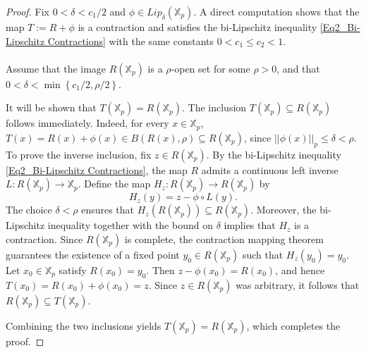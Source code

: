 \documentclass[a4paper, 12pt]{article}
\theoremstyle{definition}
\begin{document}
	
	\begin{proof}
		
		Fix $0  < \delta  <  c_{1}/2$ and $\phi \in Lip_{\delta} \left(  \mathbb{X}_{p}  \right) $. A direct computation shows that the map $T:= R + \phi$ is a contraction and satisfies the bi-Lipschitz inequality \eqref{Eq2_Bi-Lipschitz Contractions} with the same constants $0  < c_{1} \le c_{2}  < 1$. 
		
		
		
		\paragraph{}
		Assume that the image $R \left(  \mathbb{X}_{p}  \right) $ is a $\rho$-open set for some $\rho  > 0$, and that $ 0 < \delta  < \min \left\{  c_{1}/2, \rho / 2  \right\} $. 
		
		It will be shown that $T \left(  \mathbb{X}_{p}  \right)  = R \left(  \mathbb{X}_{p}  \right) $. The inclusion $T \left(  \mathbb{X}_{p}  \right)  \subseteq R \left(  \mathbb{X}_{p}  \right) $ follows immediately. Indeed, for every $x \in \mathbb{X}_{p}$, $T \left(  x  \right)  = R \left(  x  \right)  + \phi \left(  x  \right)  \in B \left(  R \left(  x  \right) , \rho  \right)  \subseteq R \left(  \mathbb{X}_{p}  \right) $, since $ \left| \left|  \phi \left(  x \right)   \right|  \right|_{p} \le \delta < \rho$.   
		To prove the inverse inclusion, fix $z \in R \left(  \mathbb{X}_{p}  \right) $. By the bi-Lipschitz inequality \eqref{Eq2_Bi-Lipschitz Contractions}, the map $R$ admits a continuous left inverse $L: R \left(  \mathbb{X}_{p}  \right)  \to \mathbb{X}_{p}$.  
		Define the map $H_{z}: R \left(  \mathbb{X}_{p}  \right)  \to R \left(  \mathbb{X}_{p}  \right) $ by  
		$$ H_{z} \left(  y  \right)    =   z - \phi \circ L (y) .$$ 
		The choice $\delta < \rho$ ensures that $H_{z} \left(  R \left(  \mathbb{X}_{p}  \right)   \right)  \subseteq R \left(  \mathbb{X}_{p}  \right) $. 
		Moreover, the bi-Lipschitz inequality together with the bound on $\delta$ implies that $H_{z}$ is a contraction. Since $R \left(  \mathbb{X}_{p}  \right) $ is complete, the contraction mapping theorem guarantees the existence of a fixed point $y_{0} \in R \left(  \mathbb{X}_{p}  \right) $ such that $H_{z} \left(  y_{0}  \right)  = y_{0}$. Let $x_{0}  \in \mathbb{X}_{p}$ satisfy $R \left(  x_{0}  \right)  = y_{0}$. Then $ z - \phi \left(  x_{0}  \right)  = R \left(  x_{0}  \right) $, and hence $T \left(  x_{0}  \right)   = R \left(  x_{0}  \right)   + \phi \left(  x_{0}  \right)  = z$. 
		Since $z \in R \left(  \mathbb{X}_{p}  \right) $ was arbitrary, it follows that $R \left(  \mathbb{X}_{p}  \right)  \subseteq T \left(  \mathbb{X}_{p}  \right) $. 
		
		Combining the two inclusions yields $T \left(  \mathbb{X}_{p}  \right)  = R \left(  \mathbb{X}_{p}  \right) $, which completes the proof. 
		
	\end{proof}
	
\end{document}
